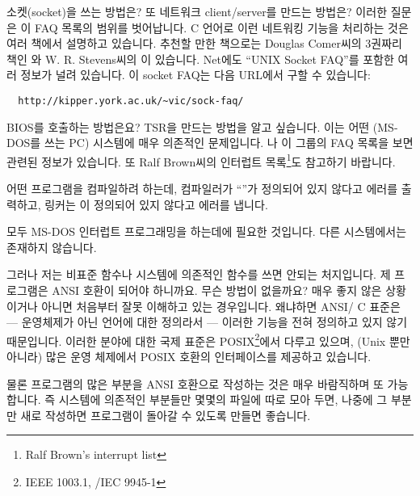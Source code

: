 \begin{faq}
	소켓(socket)을 쓰는 방법은? 또 네트워크 client/server를 만드는 방법은?
\A
	이러한 질문은 이 FAQ 목록의 범위를 벗어납니다.
	C 언어로 이런 네트워킹 기능을 처리하는 것은 여러 책에서
	설명하고 있습니다.  추천할 만한 책으로는
	Douglas Comer씨의 3권짜리 책인 와
	W.  R.  Stevens씨의 이 있습니다.
	Net에도 ``UNIX Socket FAQ''를 포함한 여러 정보가 널려 있습니다.
	이 socket FAQ는 다음 URL에서 구할 수 있습니다:
\begin{verbatim}
  http://kipper.york.ac.uk/~vic/sock-faq/
\end{verbatim}


\end{faq}

\begin{faq}
	BIOS를 호출하는 방법은요? TSR을 만드는 방법을 알고 싶습니다.
\A
	이는 어떤 (MS-DOS를 쓰는 PC) 시스템에 매우 의존적인 문제입니다.
	나 이 그룹의 FAQ 목록을 보면
	관련된 정보가 있습니다.  또 Ralf Brown씨의 인터럽트
	목록\footnote{Ralf Brown's interrupt list}도
	참고하기 바랍니다.


\end{faq}

\begin{faq}
	어떤 프로그램을 컴파일하려 하는데, 컴파일러가
	``''가 정의되어 있지 않다고 에러를 출력하고,
	링커는 이 정의되어 있지 않다고 에러를 냅니다.

\A
	모두 MS-DOS 인터럽트 프로그래밍을 하는데에 필요한 것입니다.  
	다른 시스템에서는 존재하지 않습니다.
\end{faq}

\begin{faq}
	그러나 저는 비표준 함수나 시스템에 의존적인 함수를 쓰면
	안되는 처지입니다.  제 프로그램은 ANSI 호환이 되어야 하니까요.
	무슨 방법이 없을까요?
\A
	매우 좋지 않은 상황이거나 아니면 처음부터 잘못 이해하고 있는
	경우입니다.  왜냐하면 ANSI/\cite{c89} C 표준은 --- 
	운영체제가 아닌 언어에
	대한 정의라서 --- 이러한 기능을 전혀 정의하고 있지 않기 때문입니다.
	이러한 분야에 대한 국제 표준은
	POSIX\footnote{IEEE 1003.1, \cite{c89}/IEC 9945-1}에서 다루고 있으며,
	(Unix 뿐만 아니라) 많은 운영 체제에서 POSIX 호환의 인터페이스를
	제공하고 있습니다.

	물론 프로그램의 많은 부분을 ANSI 호환으로 작성하는 것은
	매우 바람직하며 또 가능합니다.  즉 시스템에 의존적인 부분들만
	몇몇의 파일에 따로 모아 두면, 나중에 그 부분만 새로 작성하면
	프로그램이 돌아갈 수 있도록 만들면 좋습니다.
\end{faq}

%
%
